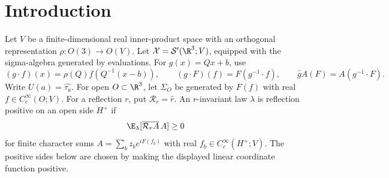 \section{Introduction}\label{sec:introduction}
Let \(V\) be a finite-dimensional real inner-product space with an
orthogonal representation \(\rho:O(3)\to O(V)\). Let
\(\mathcal X=\mathcal S'(\R^3;V)\), equipped with the sigma-algebra
generated by evaluations. For \(g(x)=Qx+b\), use
\begin{equation}\label{eq:euclidean-action}
 (g\cdot f)(x)=\rho(Q)f(Q^{-1}(x-b)),\qquad
 (g\cdot F)(f)=F(g^{-1}\cdot f),\qquad
 \widehat g A(F)=A(g^{-1}\cdot F).
\end{equation}
Write \(U(a)=\widehat{\tau_a}\).
For open \(O\subset\R^3\), let \(\Sigma_O\) be generated by
\(F(f)\) with real \(f\in C_c^\infty(O;V)\).
For a reflection \(r\), put \(\mathcal R_r=\widehat r\).
An \(r\)-invariant law \(\lambda\) is reflection positive on an
open side \(H^+\) if
\[
 \E_\lambda[\overline{\mathcal R_r A}\,A]\ge0
\]
for finite character sums \(A=\sum_bz_be^{iF(f_b)}\) with
real \(f_b\in C_c^\infty(H^+;V)\).
The positive sides below are chosen by making the displayed linear
coordinate function positive.

